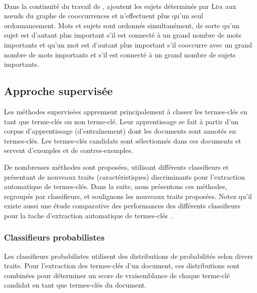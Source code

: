         ~\\Dans la continuité du travail de ,
         ajoutent les sujets déterminés par
        \textsc{Lda} aux n\oe{}uds du graphe de cooccurrences et n'effectuent
        plus qu'un seul ordonnancement. Mots et sujets sont ordonnés
        simultanément, de sorte qu'un sujet est d'autant plus important
        s'il est connecté à un grand nombre de mots importants et qu'un mot est
        d'autant plus important s'il cooccurre avec un grand nombre de mots
        importants et s'il est connecté à un grand nombre de sujets importants.

    \subsection{Approche supervisée}
    \label{subsec:main-state_of_the_art-automatic_keyphrase_extraction-supervised_keyphrase_extraction}
      Les méthodes supervisées apprennent principalement à classer les
      termes-clés en tant que \og{}terme-clés\fg{} ou \og{}non terme-clé\fg{}.
      Leur apprentissage se fait à partir d'un corpus d'apprentissage
      (d'entraînement) dont les documents sont annotés en termes-clés. Les
      termes-clés candidats sont sélectionnés dans ces documents et servent
      d'exemples et de contres-exemples.

      De nombreuses méthodes sont proposées, utilisant différents classifieurs
      et présentant de nouveaux traits (caractéristiques) discriminants pour
      l'extraction automatique de termes-clés. Dans la suite, nous présentons
      ces méthodes, regroupés par classifieurs, et soulignons les nouveaux
      traits proposées. Notez qu'il existe aussi une étude comparative des
      performances des différents classifieurs pour la tache d'extraction
      automatique de termes-clés~\cite{sarkar2012machinelearningcomparison}.

      \subsubsection{Classifieurs probabilistes}
      \label{subsubsec:main-state_of_the_art-automatic_keyphrase_extraction-supervised_keyphrase_extraction-probabilistic_models}
        Les classifieurs probabilistes utilisent des distributions de
        probabilités selon divers traits. Pour l'extraction des termes-clés d'un
        document, ces distributions sont combinées pour déterminer un score de
        vraisemblance de chaque terme-clé candidat en tant que termes-clés du
        document.

